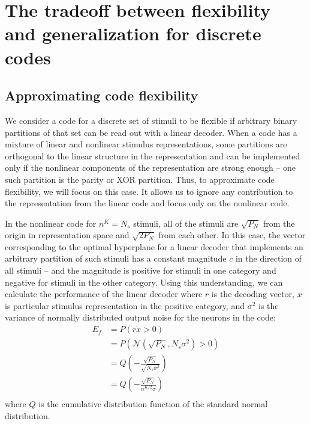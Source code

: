 \documentclass[letter,12pt]{article}
\begin{document}
\captionsetup[figure]{labelfont=bf,textfont=normalfont,
  singlelinecheck=off,justification=raggedright,font=footnotesize}
\setlength{\extrarowheight}{5pt}


\section{The tradeoff between flexibility and generalization for discrete codes}

\subsection{Approximating code flexibility}
We consider a code for a discrete set of stimuli to be flexible if arbitrary
binary partitions of that set can be read out with a linear decoder. When a code
has a mixture of linear and nonlinear stimulus representations, some partitions
are orthogonal to the linear structure in the representation and can be
implemented only if the nonlinear components of the representation are strong
enough -- one such partition is the parity or XOR partition. Thus, to approximate
code flexibility, we will focus on this case. It allows us to ignore any
contribution to the representation from the linear code and focus only on the
nonlinear code.

In the nonlinear code for $n^{K} = N_{s}$ stimuli, all of the stimuli are
$\sqrt{P_{N}}$ from the origin in representation space and $\sqrt{2P_{N}}$ from
each other. In this case, the vector corresponding to the optimal hyperplane for
a linear decoder that
implements an arbitrary partition of such stimuli has a constant magnitude
$c$ in the direction of all stimuli -- and the magnitude is positive for
stimuli in one category and negative for stimuli in the other category. Using
this understanding, we can calculate the performance of the linear decoder where
$r$ is the decoding vector, $x$ is particular stimulus representation in the
positive category, and $\sigma^{2}$ is the variance of normally distributed output
noise for the neurons in the code:
\begin{align}
  E_{f} &= P(r \dot x > 0) \\
  &= P(\mathcal{N}(\sqrt{P_{N}}, N_{s} \sigma^{2}) > 0) \\
  &= Q\left(-\frac{\sqrt{P_{N}}}{\sqrt{N_{s}\sigma^{2}}}\right) \\
  &= Q\left(-\frac{\sqrt{P_{N}}}{n^{K/2} \sigma}\right) \\
\end{align}
where $Q$ is the cumulative distribution function of the standard normal
distribution.
\end{document}
